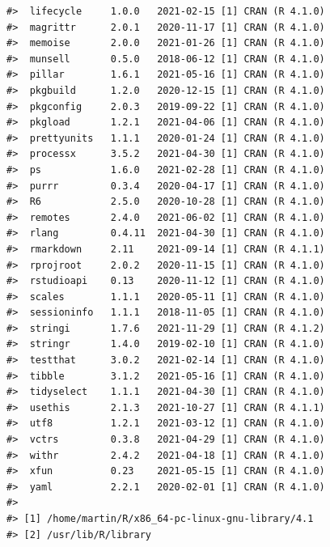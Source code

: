 \documentclass[
]{article}
\begin{document}
\begin{verbatim}
#>  lifecycle     1.0.0   2021-02-15 [1] CRAN (R 4.1.0)
#>  magrittr      2.0.1   2020-11-17 [1] CRAN (R 4.1.0)
#>  memoise       2.0.0   2021-01-26 [1] CRAN (R 4.1.0)
#>  munsell       0.5.0   2018-06-12 [1] CRAN (R 4.1.0)
#>  pillar        1.6.1   2021-05-16 [1] CRAN (R 4.1.0)
#>  pkgbuild      1.2.0   2020-12-15 [1] CRAN (R 4.1.0)
#>  pkgconfig     2.0.3   2019-09-22 [1] CRAN (R 4.1.0)
#>  pkgload       1.2.1   2021-04-06 [1] CRAN (R 4.1.0)
#>  prettyunits   1.1.1   2020-01-24 [1] CRAN (R 4.1.0)
#>  processx      3.5.2   2021-04-30 [1] CRAN (R 4.1.0)
#>  ps            1.6.0   2021-02-28 [1] CRAN (R 4.1.0)
#>  purrr         0.3.4   2020-04-17 [1] CRAN (R 4.1.0)
#>  R6            2.5.0   2020-10-28 [1] CRAN (R 4.1.0)
#>  remotes       2.4.0   2021-06-02 [1] CRAN (R 4.1.0)
#>  rlang         0.4.11  2021-04-30 [1] CRAN (R 4.1.0)
#>  rmarkdown     2.11    2021-09-14 [1] CRAN (R 4.1.1)
#>  rprojroot     2.0.2   2020-11-15 [1] CRAN (R 4.1.0)
#>  rstudioapi    0.13    2020-11-12 [1] CRAN (R 4.1.0)
#>  scales        1.1.1   2020-05-11 [1] CRAN (R 4.1.0)
#>  sessioninfo   1.1.1   2018-11-05 [1] CRAN (R 4.1.0)
#>  stringi       1.7.6   2021-11-29 [1] CRAN (R 4.1.2)
#>  stringr       1.4.0   2019-02-10 [1] CRAN (R 4.1.0)
#>  testthat      3.0.2   2021-02-14 [1] CRAN (R 4.1.0)
#>  tibble        3.1.2   2021-05-16 [1] CRAN (R 4.1.0)
#>  tidyselect    1.1.1   2021-04-30 [1] CRAN (R 4.1.0)
#>  usethis       2.1.3   2021-10-27 [1] CRAN (R 4.1.1)
#>  utf8          1.2.1   2021-03-12 [1] CRAN (R 4.1.0)
#>  vctrs         0.3.8   2021-04-29 [1] CRAN (R 4.1.0)
#>  withr         2.4.2   2021-04-18 [1] CRAN (R 4.1.0)
#>  xfun          0.23    2021-05-15 [1] CRAN (R 4.1.0)
#>  yaml          2.2.1   2020-02-01 [1] CRAN (R 4.1.0)
#> 
#> [1] /home/martin/R/x86_64-pc-linux-gnu-library/4.1
#> [2] /usr/lib/R/library
\end{verbatim}
\end{document}
